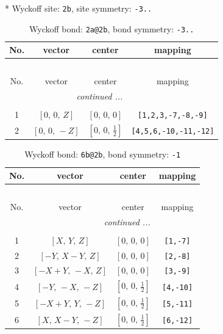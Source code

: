 \documentclass[fleqn,8pt]{jsarticle}
\begin{document}
* Wyckoff site: {\tt 2b}, site symmetry: {\tt -3..}
\renewcommand{\arraystretch}{1.2}
\begin{longtable}{cccc}
\caption{Wyckoff bond: {\tt 2a@2b}, bond symmetry: {\tt -3..}}
 \\
 \hline \hline
No. & vector & center & mapping \\ \hline \endfirsthead

\multicolumn{3}{l}{\tablename\ \thetable{}} \\
 \hline \hline
No. & vector & center & mapping \\ \hline \endhead

 \hline \hline
\multicolumn{3}{r}{\footnotesize\it continued ...} \\ \endfoot

 \hline \hline
\multicolumn{3}{r}{} \\ \endlastfoot

1 & $\left[ 0,\, 0,\, Z \right]$ & $\left[ 0,\, 0,\, 0 \right]$ & {\tt [1,2,3,-7,-8,-9]} \\ \hline
2 & $\left[ 0,\, 0,\, - Z \right]$ & $\left[ 0,\, 0,\, \frac{1}{2} \right]$ & {\tt [4,5,6,-10,-11,-12]} \\
\end{longtable}
\renewcommand{\arraystretch}{1.2}
\begin{longtable}{cccc}
\caption{Wyckoff bond: {\tt 6b@2b}, bond symmetry: {\tt -1}}
 \\
 \hline \hline
No. & vector & center & mapping \\ \hline \endfirsthead

\multicolumn{3}{l}{\tablename\ \thetable{}} \\
 \hline \hline
No. & vector & center & mapping \\ \hline \endhead

 \hline \hline
\multicolumn{3}{r}{\footnotesize\it continued ...} \\ \endfoot

 \hline \hline
\multicolumn{3}{r}{} \\ \endlastfoot

1 & $\left[ X,\, Y,\, Z \right]$ & $\left[ 0,\, 0,\, 0 \right]$ & {\tt [1,-7]} \\ \hline
2 & $\left[ - Y,\, X - Y,\, Z \right]$ & $\left[ 0,\, 0,\, 0 \right]$ & {\tt [2,-8]} \\ \hline
3 & $\left[ - X + Y,\, - X,\, Z \right]$ & $\left[ 0,\, 0,\, 0 \right]$ & {\tt [3,-9]} \\ \hline
4 & $\left[ - Y,\, - X,\, - Z \right]$ & $\left[ 0,\, 0,\, \frac{1}{2} \right]$ & {\tt [4,-10]} \\ \hline
5 & $\left[ - X + Y,\, Y,\, - Z \right]$ & $\left[ 0,\, 0,\, \frac{1}{2} \right]$ & {\tt [5,-11]} \\ \hline
6 & $\left[ X,\, X - Y,\, - Z \right]$ & $\left[ 0,\, 0,\, \frac{1}{2} \right]$ & {\tt [6,-12]} \\
\end{longtable}
\end{document}
